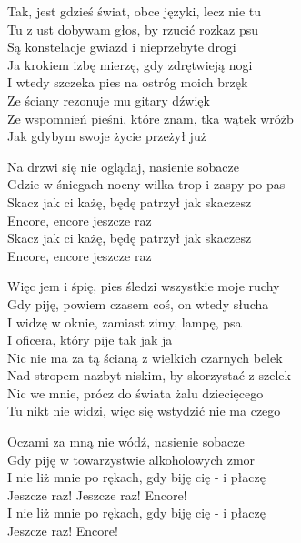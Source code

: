 \begin{text}
    Tak, jest gdzieś świat, obce języki, lecz nie tu\\
    Tu z ust dobywam głos, by rzucić rozkaz psu\\
    Są konstelacje gwiazd i nieprzebyte drogi\\
    Ja krokiem izbę mierzę, gdy zdrętwieją nogi\\
    I wtedy szczeka pies na ostróg moich brzęk\\
    Ze ściany rezonuje mu gitary dźwięk\\
    Ze wspomnień pieśni, które znam, tka wątek wróżb\\
    Jak gdybym swoje życie przeżył już

    Na drzwi się nie oglądaj, nasienie sobacze\\
    Gdzie w śniegach nocny wilka trop i zaspy po pas\\
    Skacz jak ci każę, będę patrzył jak skaczesz\\
    Encore, encore jeszcze raz\\
    Skacz jak ci każę, będę patrzył jak skaczesz\\
    Encore, encore jeszcze raz

    Więc jem i śpię, pies śledzi wszystkie moje ruchy\\
    Gdy piję, powiem czasem coś, on wtedy słucha\\
    I widzę w oknie, zamiast zimy, lampę, psa\\
    I oficera, który pije tak jak ja\\
    Nic nie ma za tą ścianą z wielkich czarnych belek\\
    Nad stropem nazbyt niskim, by skorzystać z szelek\\
    Nic we mnie, prócz do świata żalu dziecięcego\\
    Tu nikt nie widzi, więc się wstydzić nie ma czego

    Oczami za mną nie wódź, nasienie sobacze\\
    Gdy piję w towarzystwie alkoholowych zmor\\
    I nie liż mnie po rękach, gdy biję cię - i płaczę\\
    Jeszcze raz! Jeszcze raz! Encore!\\
    I nie liż mnie po rękach, gdy biję cię - i płaczę\\
    Jeszcze raz! Encore!

\end{text}
